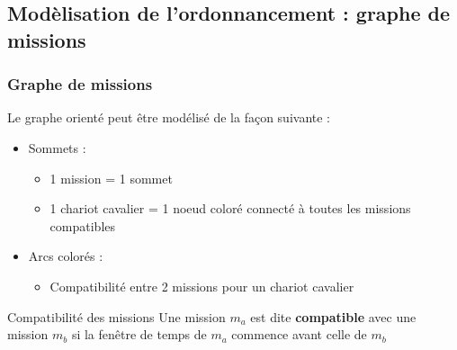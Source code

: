 \documentclass{beamer}
\begin{document}
\subsection*{Modèlisation de l'ordonnancement : graphe de missions}
\begin{frame}
\frametitle{Graphe de missions}
	Le graphe orienté peut être modélisé de la façon suivante :
		\begin{itemize}
	 		\item Sommets : 
				\begin{itemize}
 					\item 1 mission = 1 sommet
					\item 1 chariot cavalier = 1 noeud coloré connecté à toutes les missions compatibles
				\end{itemize}
 
			\item Arcs colorés :
				\begin{itemize}
					\item Compatibilité entre 2 missions pour un chariot cavalier
				\end{itemize}
		\end{itemize}


	\begin{block}{Compatibilité des missions}
		Une mission $m_a$ est dite \textbf{compatible} avec une mission $m_b$ si la fenêtre de temps de $m_a$ commence avant celle de $m_b$
	\end{block}

\end{frame}
\end{document}
